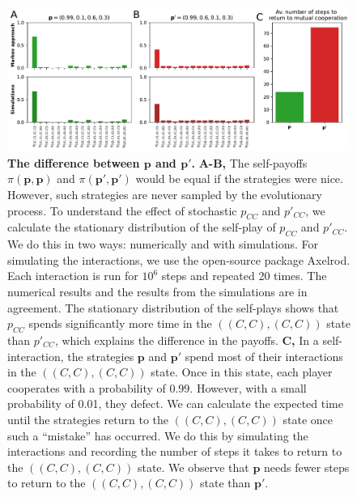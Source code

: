 \documentclass[11pt]{article}
\theoremstyle{plainCl1}
\theoremstyle{plainCl2}
\begin{document}
\begin{figure}
  \centering
  \includegraphics[width=\textwidth]{../../figures/siFigReactiveTwoPayoffs.pdf}
  \caption{\textbf{The difference between \(\mathbf{p}\) and \(\mathbf{p'}\).}
  {\bf A-B,} The self-payoffs \(\pi(\mathbf{p}, \mathbf{p})\) and \(\pi(\mathbf{p'},
  \mathbf{p'})\) would be equal if the strategies were nice. However, such
  strategies are never sampled by the evolutionary process. To understand the
  effect of stochastic \(p_{CC}\) and \(p'_{CC}\), we calculate the stationary
  distribution of the self-play of \(p_{CC}\) and \(p'_{CC}\). We do this in two
  ways: numerically and with simulations. For simulating the interactions, we use
  the open-source package Axelrod. Each interaction is run for \(10^6\) steps and
  repeated 20 times. The numerical results and the results from the simulations
  are in agreement. The stationary distribution of the self-plays shows that
  \(p_{CC}\) spends significantly more time in the \(((C, C), (C, C))\) state than
  \(p'_{CC}\), which explains the difference in the payoffs.
  {\bf C,} In a self-interaction, the strategies \(\mathbf{p}\) and \(\mathbf{p'}\) spend
  most of their interactions in the \(((C, C), (C, C))\) state. Once in this
  state, each player cooperates with a probability of 0.99. However, with a small
  probability of 0.01, they defect. We can calculate the expected time until the
  strategies return to the \(((C, C), (C, C))\) state once such a ``mistake'' has
  occurred. We do this by simulating the interactions and recording the number of
  steps it takes to return to the \(((C, C), (C, C))\) state. We observe that
  \(\mathbf{p}\) needs fewer steps to return to the \(((C, C), (C, C))\) state
  than \(\mathbf{p'}\).
  }\label{fig:ReactiveTwoPayoffs}
\end{figure}
\end{document}
